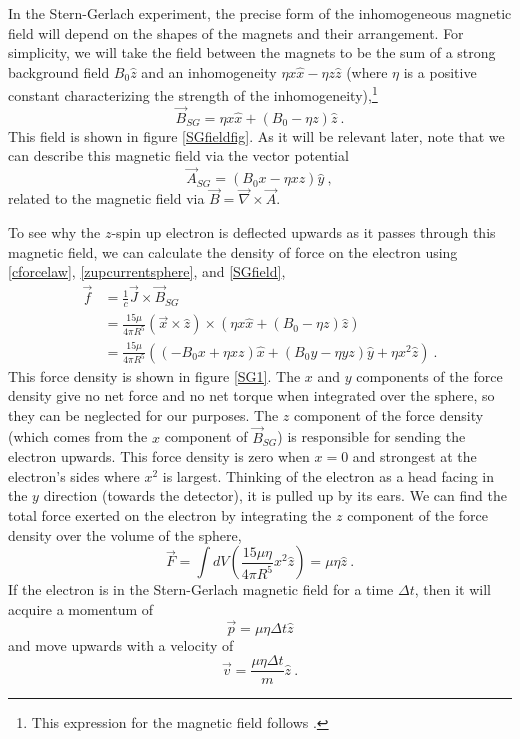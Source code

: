 \documentclass[onecolumn,secnumarabic,amsmath,amssymb,balancelastpage,nofootinbib]{article}
\begin{document}
In the Stern-Gerlach experiment, the precise form of the inhomogeneous magnetic field will depend on the shapes of the magnets and their arrangement.  For simplicity, we will take the field between the magnets to be the sum of a strong background field $B_0\hat{z}$ and an inhomogeneity $\eta x \hat{x}- \eta z\hat{z}$ (where $\eta$ is a positive constant characterizing the strength of the inhomogeneity),\footnote{This expression for the magnetic field follows \citet[pg.\ 181]{griffithsQM}.}
\begin{equation}
\vec{B}_{SG}=\eta x \hat{x}+(B_0 - \eta z)\hat{z}
\ .
\label{SGfield}
\end{equation}
This field is shown in figure \ref{SGfieldfig}.  As it will be relevant later, note that we can describe this magnetic field via the vector potential
\begin{equation}
\vec{A}_{SG}=(B_0 x - \eta x z)\hat{y}
\ ,
\label{SGvector}
\end{equation}
related to the magnetic field via $\vec{B}=\vec{\nabla}\times\vec{A}$.

To see why the $z$-spin up electron is deflected upwards as it passes through this magnetic field, we can calculate the density of force on the electron using \eqref{cforcelaw}, \eqref{zupcurrentsphere}, and \eqref{SGfield},
\begin{align}
\vec{f}&=\frac{1}{c}\vec{J}\times\vec{B}_{SG}
\nonumber
\\
&=\frac{15 \mu}{4 \pi R^5} (\vec{x}\times\hat{z})\times(\eta x \hat{x} +(B_0 - \eta z)\hat{z})
\nonumber
\\
&=\frac{15 \mu}{4 \pi R^5} \left( (-B_0 x + \eta x z) \hat{x} + (B_0 y - \eta y z)\hat{y} + \eta x^2 \hat{z} \right)
\ .
\label{zupsphereforcedensity}
\end{align}
This force density is shown in figure \ref{SG1}.  The $x$ and $y$ components of the force density give no net force and no net torque when integrated over the sphere, so they can be neglected for our purposes.  The  $z$ component of the force density (which comes from the $x$ component of $\vec{B}_{SG}$) is responsible for sending the electron upwards.  This force density is zero when $x=0$ and strongest at the electron's sides where $x^2$ is largest.  Thinking of the electron as a head facing in the $y$ direction (towards the detector), it is pulled up by its ears.  We can find the total force exerted on the electron by integrating the $z$ component of the force density over the volume of the sphere,
\begin{equation}
\vec{F}= \int dV \left( \frac{15 \mu \eta}{4 \pi R^5} x^2 \hat{z}\right)=\mu \eta \hat{z}
\ .
\label{zforcesphere}
\end{equation}
If the electron is in the Stern-Gerlach magnetic field for a time $\Delta t$, then it will acquire a momentum of
\begin{equation}
\vec{p}=\mu \eta \Delta t \hat{z}
\label{zmomentumsphere}
\end{equation}
and move upwards with a velocity of
\begin{equation}
\vec{v}=\frac{\mu \eta \Delta t}{m} \hat{z}
\ .
\label{zvelocitysphere}
\end{equation}
\end{document}
